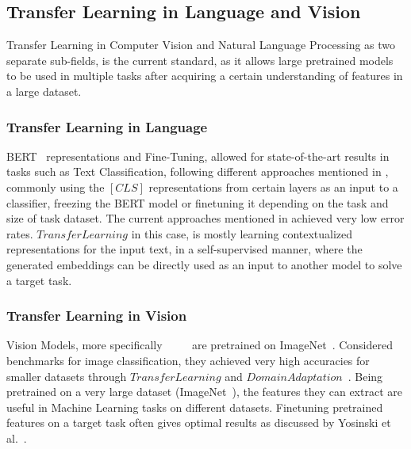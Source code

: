 \documentclass[conference]{IEEEtran}
\begin{document}
\subsection{Transfer Learning in Language and Vision}
Transfer Learning in Computer Vision and Natural Language Processing as two separate sub-fields, is the current standard, as it allows large pretrained models to be used in multiple tasks after acquiring a certain understanding of features in a large dataset.

\subsubsection{Transfer Learning in Language}

BERT~\cite{Bert} representations and Fine-Tuning,
allowed for state-of-the-art results in tasks such as Text Classification, following different approaches mentioned in \cite{bertfine}, commonly using the $[CLS]$ representations from certain layers as an input to a classifier, freezing the BERT model or finetuning it depending on the task and size of task dataset. The current approaches mentioned in \cite{bertfine} achieved very low error rates. $Transfer Learning$ in this case, is mostly learning contextualized representations for the input text, in a self-supervised manner, where the generated embeddings can be directly used as an input to another model to solve a target task. 

\subsubsection{Transfer Learning in Vision}
Vision Models, more specifically \cite{alexnet}~\cite{shufflenetv2}~\cite{vgg16}~\cite{resnet}~\cite{resnext} are pretrained on ImageNet~\cite{imagenet}. Considered benchmarks for image classification, they achieved very high accuracies for smaller datasets through $Transfer Learning$ and $Domain Adaptation$~\cite{domainshift}. Being pretrained on a very large dataset (ImageNet~\cite{imagenet}), the features they can extract are useful in Machine Learning tasks on different datasets. Finetuning pretrained features on a target task often gives optimal results as discussed by Yosinski et al.~\cite{howtransferable}. 
\end{document}
